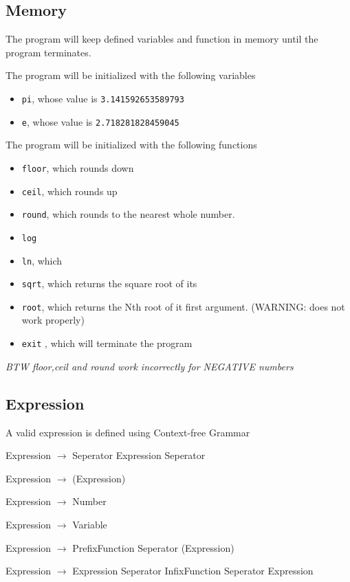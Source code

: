 \documentclass[11pt,a4paper]{article}
\begin{document}
\subsection{Memory}
The program will keep defined variables and function in memory
until the program terminates.


The program will be initialized with the following variables
\begin{itemize}
\item \texttt{pi}, whose value is \texttt{3.141592653589793}
\item \texttt{e}, whose value is \texttt{2.718281828459045}
\end{itemize}


The program will be initialized with the following functions
\begin{itemize}
\item \texttt{floor}, which rounds down
\item \texttt{ceil}, which rounds up
\item \texttt{round}, which rounds to the nearest  whole number.
\item \texttt{log}
\item \texttt{ln}, which
\item \texttt{sqrt}, which returns the square root of its
\item \texttt{root}, which returns the Nth root of it first argument.  (WARNING: does not work properly)
\item \texttt{exit} , which will terminate the program
\end{itemize}



\emph{BTW floor,ceil and round work incorrectly for NEGATIVE numbers}
\subsection{Expression}
A valid expression is defined using Context-free Grammar

Expression \(\rightarrow\) Seperator Expression Seperator

Expression \(\rightarrow\) (Expression)

Expression \(\rightarrow\) Number

Expression \(\rightarrow\) Variable

Expression \(\rightarrow\) PrefixFunction Seperator (Expression)

Expression \(\rightarrow\) Expression Seperator InfixFunction Seperator Expression
\end{document}
